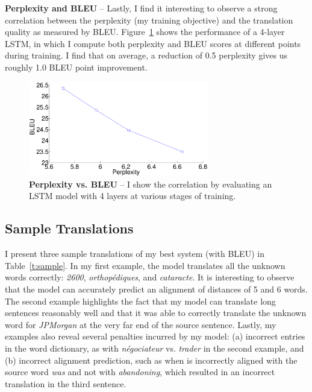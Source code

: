 {\bf Perplexity and BLEU} -- Lastly, I find it interesting to observe a strong correlation 
between the perplexity (my training objective) and the translation quality as measured by BLEU. 
Figure~\ref{f:cor} shows the performance of a 4-layer LSTM, in which I compute both perplexity and 
BLEU scores at different points during training. I find that on average, a reduction of 0.5 perplexity 
gives us roughly 1.0 BLEU point improvement.
\begin{figure}[tbh!]
\centering
\includegraphics[width=0.7\textwidth, clip=true, trim= 0 0 0 0]{img/3-cor} %
\caption[Perplexity vs. BLEU]{{\bf Perplexity vs. BLEU} -- I show the correlation by evaluating an LSTM model with 4 layers at various stages of training. 
} 
\label{f:cor}
\end{figure}


\subsection{Sample Translations}
I present three sample translations of my best system
(with \bestbleuunk{} BLEU) in Table~\ref{t:sample}. In my  first example,
the model translates all the
unknown words correctly: {\it 2600}, {\it orthop{\'e}diques}, and {\it
cataracte}. It is interesting to observe that the model can accurately predict
an alignment of distances of 5 and 6 words. The second
example highlights the fact that my model can translate long
sentences reasonably well and that it was able to
correctly translate the unknown word for {\it JPMorgan} at the very far end of
the source sentence. Lastly, my examples also reveal several
penalties incurred by my model: (a) incorrect entries in the word dictionary, as with {\it n\'{e}gociateur} vs. {\it trader} in the second example, 
and (b) incorrect alignment prediction, such as when 
  is incorrectly aligned
with the source word {\it was} and not with {\it abandoning}, which resulted in an
incorrect translation in the third sentence.

